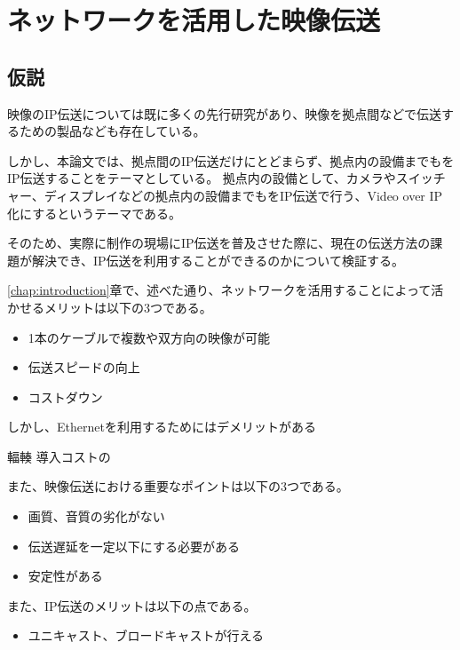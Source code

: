 \chapter{ネットワークを活用した映像伝送}
\label{chap:network-transmission}

\section{仮説}
映像のIP伝送については既に多くの先行研究があり、映像を拠点間などで伝送するための製品なども存在している。

しかし、本論文では、拠点間のIP伝送だけにとどまらず、拠点内の設備までもをIP伝送することをテーマとしている。
拠点内の設備として、カメラやスイッチャー、ディスプレイなどの拠点内の設備までもをIP伝送で行う、Video over IP化にするというテーマである。

そのため、実際に制作の現場にIP伝送を普及させた際に、現在の伝送方法の課題が解決でき、IP伝送を利用することができるのかについて検証する。


\ref{chap:introduction}章で、述べた通り、ネットワークを活用することによって活かせるメリットは以下の3つである。

\begin{itemize}
  \item 1本のケーブルで複数や双方向の映像が可能
  \item 伝送スピードの向上
  \item コストダウン
\end{itemize}

しかし、Ethernetを利用するためにはデメリットがある

輻輳
導入コストの

また、映像伝送における重要なポイントは以下の3つである。

\begin{itemize}
  \item 画質、音質の劣化がない
  \item 伝送遅延を一定以下にする必要がある
  \item 安定性がある
\end{itemize}

また、IP伝送のメリットは以下の点である。

\begin{itemize}
  \item ユニキャスト、ブロードキャストが行える
\end{itemize}


